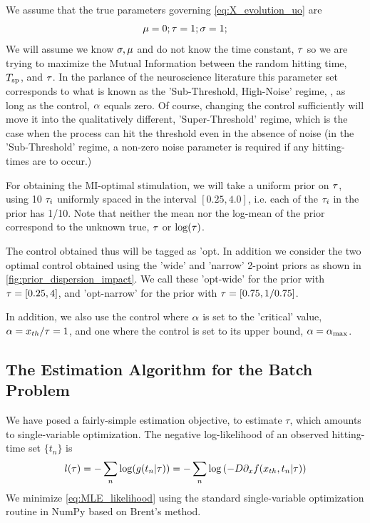 \documentclass{article}
\begin{document}
We assume that the true parameters governing \cref{eq:X_evolution_uo} are
$$ {\mu } = 0; { \tau } = 1; {\sigma } = 1;
$$ We will assume we know ${\sigma }, {\mu }$ and do not know the time constant, ${ \tau }$ so
we are trying to maximize the Mutual Information between the random hitting
time, ${ T_{\textrm{sp} } }$, and ${ \tau }$. In the parlance of the neuroscience literature this
parameter set corresponds to what is known as the 'Sub-Threshold, High-Noise'
regime, \cite{Iolov2013}, as long as the control, ${\alpha}$ equals zero. Of course,
changing the control sufficiently will move it into the qualitatively different,
'Super-Threshold' regime, which is the case when the process can hit the
threshold even in the absence of noise (in the 'Sub-Threshold' regime, a
non-zero noise parameter is required if any hitting-times are to occur.)

For obtaining the MI-optimal stimulation, we will take a uniform prior on
${ \tau }$, using 10 ${ \tau }_i$ uniformly spaced in the interval $[0.25, 4.0]$, i.e.
each of the ${ \tau }_i$ in the prior has 1/10. Note that neither the mean nor the
log-mean of the prior correspond to the unknown true, ${ \tau }$ or $\log({ \tau })$.
 
The control obtained thus will be tagged as 'opt. In addition we consider the
two optimal control obtained using the 'wide' and 'narrow' 2-point priors as
shown in \cref{fig:prior_dispersion_impact}. We call these 'opt-wide' for the
prior with ${ \tau } =  [0.25, 4]$, and 'opt-narrow' for the prior with  ${ \tau } =  
[0.75, 1/0.75]$.  

In addition, we also use the control where ${\alpha}$ is set to the 'critical' value,
${\alpha} = { x_{th} }/{ \tau } = 1$, and one where the control is set to its upper
bound, ${\alpha} = { {\alpha}_{\textrm{max}} }$.

\subsection{The Estimation Algorithm for the Batch Problem}
We have posed a fairly-simple estimation objective, to estimate $\tau$, which
amounts to single-variable optimization. The negative log-likelihood of an
observed hitting-time set $\{t_n\}$ is
\begin{equation}
l({ \tau }) = - \sum_n \log ( g(t_n | { \tau }) ) =  - \sum_n \log \left( -D {\partial}_x f({ x_{th} },
t_n |{ \tau }) \right)
\label{eq:MLE_likelihood}
\end{equation}
We minimize \cref{eq:MLE_likelihood} using the standard single-variable
optimization routine in NumPy based on Brent's method.
\end{document}
